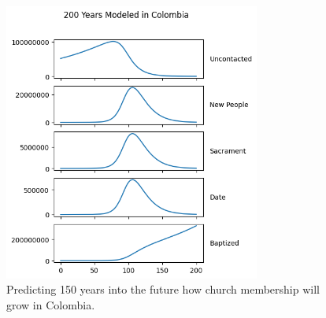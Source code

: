 \documentclass[11pt]{amsart}
\begin{document}
\begin{figure}[htb]
\begin{center} %
\includegraphics[width=0.75\textwidth]{200YearsColombia.png} %
\end{center}
\caption{Predicting 150 years into the future how church membership will grow in Colombia.}
\label{fig:Colombia200} %
\end{figure}

\end{document}
